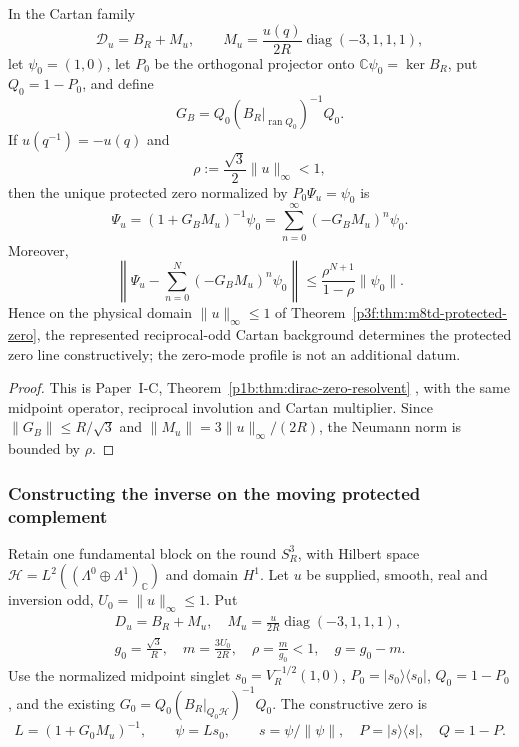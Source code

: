 \documentclass[11pt,a4paper]{article}
\begin{document}
\begin{corollary}
\label{p3f:cor:m8td-constructive-protected-zero}
In the Cartan family
\[
 \mathcal D_u=B_R+M_u,\qquad
 M_u=\frac{u(q)}{2R}\operatorname{diag}(-3,1,1,1),
\]
let \(\psi_0=(1,0)\), let \(P_0\) be the orthogonal projector onto
\(\mathbb C\psi_0=\ker B_R\), put \(Q_0=1-P_0\), and define
\[
 G_B=Q_0(B_R|_{\operatorname{ran}Q_0})^{-1}Q_0.
\]
If \(u(q^{-1})=-u(q)\) and
\[
 \rho:=\frac{\sqrt3}{2}\|u\|_\infty<1,
\]
then the unique protected zero normalized by \(P_0\Psi_u=\psi_0\) is
\begin{equation}
 \boxed{\Psi_u=(1+G_BM_u)^{-1}\psi_0
 =\sum_{n=0}^{\infty}(-G_BM_u)^n\psi_0.}
 \label{p3f:eq:m8td-constructive-zero}
\end{equation}
Moreover,
\begin{equation}
 \left\|\Psi_u-\sum_{n=0}^{N}(-G_BM_u)^n\psi_0\right\|
 \le \frac{\rho^{N+1}}{1-\rho}\|\psi_0\|.
 \label{p3f:eq:m8td-zero-truncation}
\end{equation}
Hence on the physical domain \(\|u\|_\infty\le1\) of
Theorem~\ref{p3f:thm:m8td-protected-zero}, the represented reciprocal-odd
Cartan background determines the protected zero line constructively; the
zero-mode profile is not an additional datum.
\end{corollary}
\begin{proof}
This is Paper~I-C, Theorem~\ref{p1b:thm:dirac-zero-resolvent}
\cite{Kugelmann2026Paper1C}, with the same midpoint operator, reciprocal
involution and Cartan multiplier. Since \(\|G_B\|\le R/\sqrt3\) and
\(\|M_u\|=3\|u\|_\infty/(2R)\), the Neumann norm is bounded by \(\rho\).
\end{proof}


\subsubsection{Constructing the inverse on the moving protected complement}
\label{p3f:sec:native-shift-complement}

Retain one fundamental block on the round \(S_R^3\), with Hilbert space
\(\mathcal H=L^2((\Lambda^0\oplus\Lambda^1)_{\mathbb C})\) and
domain \(H^1\). Let \(u\) be supplied, smooth, real and inversion odd,
\(U_0=\lVert u\rVert_\infty\le1\). Put
\[
\begin{gathered}
 D_u=B_R+M_u,\quad M_u=\frac{u}{2R}\operatorname{diag}(-3,1,1,1),\\
 g_0=\frac{\sqrt3}{R},\quad m=\frac{3U_0}{2R},\quad
 \rho=\frac{m}{g_0}<1,\quad g=g_0-m.
\end{gathered}
\]
Use the normalized midpoint singlet \(s_0=V_R^{-1/2}(1,0)\),
\(P_0=|s_0\rangle\langle s_0|\), \(Q_0=1-P_0\), and the existing
\(G_0=Q_0(B_R|_{Q_0\mathcal H})^{-1}Q_0\). The constructive zero is
\[
 L=(1+G_0M_u)^{-1},\qquad \psi=Ls_0,\qquad
 s=\psi/\lVert\psi\rVert,\quad P=|s\rangle\langle s|,\quad Q=1-P.
\]
\end{document}
